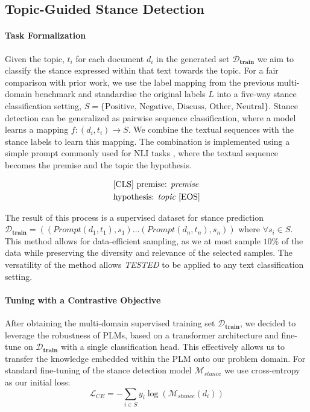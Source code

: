\documentclass[11pt]{article}
\begin{document}
\subsection{Topic-Guided Stance Detection}\label{sec:methods:stance}

\paragraph{Task Formalization}

Given the topic, $t_i$ for each document $d_i$ in the generated set $\mathcal{D}_\textbf{train}$ we aim to classify the stance expressed within that text towards the topic. For a fair comparison with prior work, we use the label mapping from the previous multi-domain benchmark \citep{hardalov2021cross} and standardise the original labels $L$ into a five-way stance classification setting, $S = \{\text{Positive, Negative, Discuss, Other, Neutral}\}$. Stance detection can be generalized as pairwise sequence classification, where a model learns a mapping $f:(d_i, t_i) \to S$. We combine the textual sequences with the stance labels to learn this mapping. The combination is implemented using a simple prompt commonly used for NLI tasks \cite{lan2019albert, raffel2020exploring,hambardzumyan2021warp}, where the textual sequence becomes the premise and the topic the hypothesis.

\begin{equation*} \label{prompt:combination}
\begin{split}
& \text{[CLS] premise: \textit{premise}} \\ 
& \text{hypothesis: \textit{topic} [EOS]}
\end{split}
\end{equation*}


The result of this process is a supervised dataset for stance prediction $\mathcal{D}_\textbf{train} = ((Prompt(d_1,t_1), s_1) \dots (Prompt(d_n,t_n), s_n))$ where $\forall s_i \in S$. This method allows for data-efficient sampling, as we at most sample $10\%$ of the data while preserving the diversity and relevance of the selected samples. The versatility of the method allows \emph{TESTED} to be applied to any text classification setting.

\paragraph{Tuning with a Contrastive Objective}

After obtaining the multi-domain supervised training set $\mathcal{D}_\textbf{train}$, we decided to leverage the robustness of PLMs, based on a transformer architecture \cite{vaswani2017attention} and fine-tune on $\mathcal{D}_\textbf{train}$ with a single classification head. This effectively allows us to transfer the knowledge embedded within the PLM onto our problem domain. For standard fine-tuning of the stance detection model $\mathcal{M}_\textit{stance}$ we use cross-entropy as our initial loss:
\begin{equation}
\mathcal{L}_\textit{CE} = -\sum \limits_{i \in S}  y_i \log \left(\mathcal{M}_\textit{stance}(d_i)\right)
\end{equation}
\end{document}
